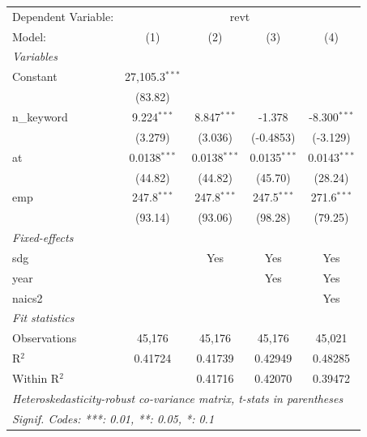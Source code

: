 
\begingroup
\centering
\begin{tabular}{lcccc}
   \tabularnewline \midrule \midrule
   Dependent Variable: & \multicolumn{4}{c}{revt}\\
   Model:       & (1)              & (2)            & (3)            & (4)\\  
   \midrule
   \emph{Variables}\\
   Constant     & 27,105.3$^{***}$ &                &                &   \\   
                & (83.82)          &                &                &   \\   
   n\_keyword   & 9.224$^{***}$    & 8.847$^{***}$  & -1.378         & -8.300$^{***}$\\   
                & (3.279)          & (3.036)        & (-0.4853)      & (-3.129)\\   
   at           & 0.0138$^{***}$   & 0.0138$^{***}$ & 0.0135$^{***}$ & 0.0143$^{***}$\\   
                & (44.82)          & (44.82)        & (45.70)        & (28.24)\\   
   emp          & 247.8$^{***}$    & 247.8$^{***}$  & 247.5$^{***}$  & 271.6$^{***}$\\   
                & (93.14)          & (93.06)        & (98.28)        & (79.25)\\   
   \midrule
   \emph{Fixed-effects}\\
   sdg          &                  & Yes            & Yes            & Yes\\  
   year         &                  &                & Yes            & Yes\\  
   naics2       &                  &                &                & Yes\\  
   \midrule
   \emph{Fit statistics}\\
   Observations & 45,176           & 45,176         & 45,176         & 45,021\\  
   R$^2$        & 0.41724          & 0.41739        & 0.42949        & 0.48285\\  
   Within R$^2$ &                  & 0.41716        & 0.42070        & 0.39472\\  
   \midrule \midrule
   \multicolumn{5}{l}{\emph{Heteroskedasticity-robust co-variance matrix, t-stats in parentheses}}\\
   \multicolumn{5}{l}{\emph{Signif. Codes: ***: 0.01, **: 0.05, *: 0.1}}\\
\end{tabular}
\par\endgroup


